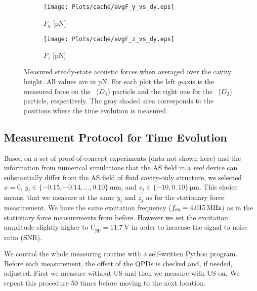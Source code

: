 \begin{figure}[H]
  \centering
  \begin{subfigure}{\figWidth}
    \centering
    \caption{$F_{y}$ [\si{\pico\newton}]}\label{subfig:F_y}
    \texttt{[image: Plots/cache/avgF\_y\_vs\_dy.eps]}
  \end{subfigure}%
  \begin{subfigure}{\figWidth}
    \centering
    \caption{$F_{z}$ [\si{\pico\newton}]}\label{subfig:F_z}
    \texttt{[image: Plots/cache/avgF\_z\_vs\_dy.eps]}
  \end{subfigure}%
  \caption{Measured steady-state acoustic forces when averaged over the cavity 
    height. All values are in \si{\pico\newton}. For each plot the left 
    $y$-axis is the measured force on the \Dfour~($D_{4}$) particle and the 
    right one for the \Dtwo~($D_{2}$) particle, respectively.
    The gray shaded area corresponds to the positions where the time evolution 
  is measured.}\label{fig:averaged_forces_vs_dy}
\end{figure}

\subsection{Measurement Protocol for Time Evolution}

Based on a set of proof-of-concept experiments (data not shown here) and the 
information from numerical simulations that the AS field in a \emph{real} 
device can substantially differ from the AS field of fluid cavity-only 
structure, we selected $x = 0$, $y_{i} \in 
\{-0.15,-0.14,\dots,0.10\}\,\si{\mm}$, and $z_{j} \in \{-10,0,10\}\,\si{\um}$. 
This choice means, that we measure at the same $y_{i}$ and $z_{j}$ as for the 
stationary force measurement. We have the same excitation frequency ($\fex = 
\SI{4.015}{\MHz}$) as in the stationary force measurements from before. However 
we set the excitation amplitude slightly higher to $U_{\text{pp}} = 
\SI{11.7}{\volt}$ in order to increase the signal to noise ratio (SNR).

We control the whole measuring routine with a self-written Python program. 
Before each measurement, the offset of the QPDs is checked and, if needed, 
adjusted. First we measure without US and then we measure with US on. We repeat 
this procedure 50 times before moving to the next location.

